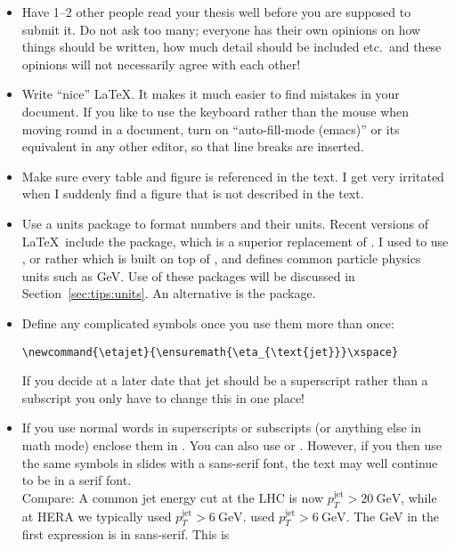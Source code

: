 \begin{itemize}
\item Have 1--2 other people read your thesis well before you are
  supposed to submit it. Do not ask too many; everyone has their own
  opinions on how things should be written, how much detail should be
  included etc.\ and these opinions will not necessarily agree with
  each other!
\item Write \enquote{nice} \LaTeX. It makes it much easier to find mistakes
  in your document. If you like to use the keyboard rather than the
  mouse when moving round in a document, turn on \enquote{auto-fill-mode
  (emacs)} or its equivalent in any other editor, so
  that line breaks are inserted.
\item Make sure every table and figure is referenced in the text. I
  get very irritated when I suddenly find a figure that is not
  described in the text.
\item Use a units package to format numbers and their units. Recent
  versions of \LaTeX\ include the  package, which
  is a superior replacement of . I used to
  use , or rather  which is
  built on top of , and defines common particle
  physics units such as \si{\GeV}. Use of these packages will be
  discussed in Section~\ref{sec:tips:units}. An alternative is the
   package.
\item Define any complicated symbols once you use them more than
  once:
\begin{verbatim}
\newcommand{\etajet}{\ensuremath{\eta_{\text{jet}}}\xspace}
\end{verbatim}
  If you decide at a later date that jet should be a superscript
  rather than a subscript you only have to change this in one place!
\item If you use normal words in superscripts or subscripts (or
  anything else in math mode) enclose them in . You can
  also use  or . However, if you then use
  the same symbols in slides with a sans-serif font, the text may well
  continue to be in a
  serif font.\\
  {\sffamily Compare: A common jet energy cut at the LHC is now
    $p_{T}^{\text{jet}} > \SI{20}{\GeV}$, while at HERA we typically
     {%
      used $p_{T}^{\mathrm{jet}} > \SI[obeyfamily=false]{6}{\GeV}$.
    }{%
      used $p_{T}^{\mathrm{jet}} > \SI[detect-family=false]{6}{\GeV}$.
    }}
  The \si{\GeV} in the first expression is in sans-serif. This is

\end{itemize}
